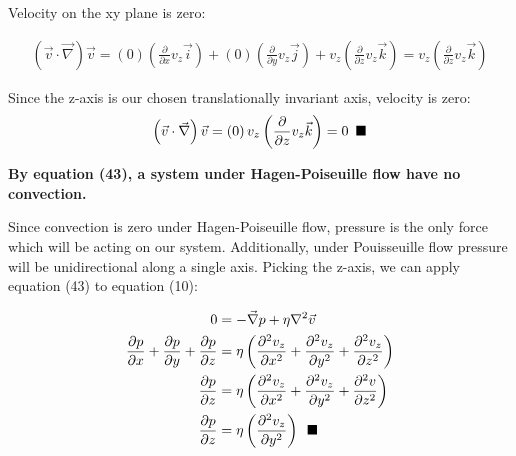 \documentclass[titlepage]{article}
\begin{document}
\noindent Velocity on the xy plane is zero:

\begin{align}
    \left(\vec{v}\cdot\vec{\nabla}\right)\vec{v}=\left(0\right)\left(\displaystyle\frac{\partial}{\partial{x}}v_{z}\vec{i}\right)+\left(0\right)\left(\displaystyle\frac{\partial}{\partial{y}}v_{z}\vec{j}\right)+v_{z}\left(\displaystyle\frac{\partial}{\partial{z}}v_{z}\vec{k}\right) 
    =v_{z}\left(\displaystyle\frac{\partial}{\partial{z}}v_{z}\vec{k}\right) 
\end{align}

\noindent Since the z-axis is our chosen translationally invariant axis, velocity is zero:
\begin{align}
    \left(\vec{v}\cdot\vec{\nabla}\right)\vec{v}=\left(0\right)v_{z}\left(\displaystyle\frac{\partial}{\partial{z}}v_{z}\vec{k}\right)=0\hspace*{5pt}\blacksquare
\end{align}

\noindent \textbf{By equation (43), a system under Hagen-Poiseuille flow have no convection.} 

\newpage
\noindent  Since convection is zero under Hagen-Poiseuille flow, pressure is the only force which will be acting on our system. Additionally, under Pouisseuille flow pressure will be unidirectional along a single axis. Picking the z-axis, we can apply equation (43) to equation (10): 

\begingroup
    \addtolength\jot{5pt}
    \begin{align}
        0&=-\vec{\nabla}p+\eta\nabla^2\vec{v}\\   
        \displaystyle\frac{\partial{p}}{\partial{x}}+\displaystyle\frac{\partial{p}}{\partial{y}}+\frac{\partial{p}}{\partial{z}}&=\eta\left(\displaystyle\frac{\partial^2{v_{z}}}{\partial{x}^2}+\displaystyle\frac{\partial^2{v_{z}}}{\partial{y}^2}+\displaystyle\frac{\partial^2{v_{z}}}{\partial{z}^2}\right) \\ 
        \displaystyle\frac{\partial{p}}{\partial{z}}&=\eta\left(\frac{\partial^2{v_{z}}}{\partial{x}^2}+\displaystyle\frac{\partial^2{v_{z}}}{\partial{y}^2}+\frac{\partial^2{v}}{\partial{z}^2}\right) \\
    \displaystyle\frac{\partial{p}}{\partial{z}}&=\eta\left(\displaystyle\frac{\partial^2{v_{z}}}{\partial{y}^2}\right)\hspace*{5pt}\blacksquare 
\end{align} \\
\end{document}
